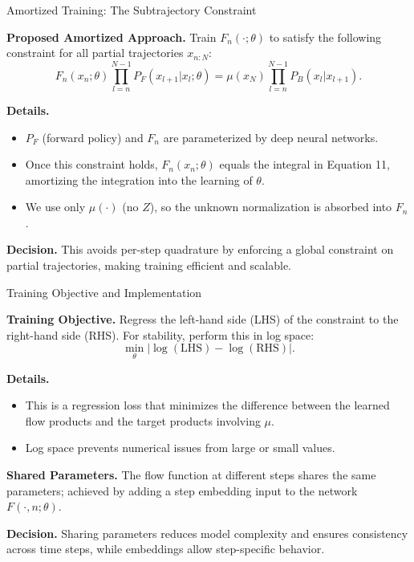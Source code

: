 \documentclass[aspectratio=169,xcolor=dvipsnames]{beamer}
\begin{document}
\begin{frame}[t]{Amortized Training: The Subtrajectory Constraint}
\footnotesize

\textbf{Proposed Amortized Approach.} Train $F_n(\cdot; \theta)$ to satisfy the following constraint for all partial trajectories $x_{n:N}$:
\[
F_n(x_n; \theta) \prod_{l=n}^{N-1} P_F(x_{l+1} | x_l; \theta) = \mu(x_N) \prod_{l=n}^{N-1} P_B(x_l | x_{l+1}).
\]

\textbf{Details.}
\begin{itemize}\itemsep2pt
  \item $P_F$ (forward policy) and $F_n$ are parameterized by deep neural networks.
  \item Once this constraint holds, $F_n(x_n; \theta)$ equals the integral in Equation 11, amortizing the integration into the learning of $\theta$.
  \item We use only $\mu(\cdot)$ (no $Z$), so the unknown normalization is absorbed into $F_n$.
\end{itemize}

\textbf{Decision.} This avoids per-step quadrature by enforcing a global constraint on partial trajectories, making training efficient and scalable.

\end{frame}

\begin{frame}[t]{Training Objective and Implementation}
\footnotesize

\textbf{Training Objective.} Regress the left-hand side (LHS) of the constraint to the right-hand side (RHS). For stability, perform this in log space:
\[
\min_\theta \left| \log(\text{LHS}) - \log(\text{RHS}) \right|.
\]

\textbf{Details.}
\begin{itemize}\itemsep2pt
  \item This is a regression loss that minimizes the difference between the learned flow products and the target products involving $\mu$.
  \item Log space prevents numerical issues from large or small values.
\end{itemize}

\textbf{Shared Parameters.} The flow function at different steps shares the same parameters; achieved by adding a step embedding input to the network $F(\cdot, n; \theta)$.

\textbf{Decision.} Sharing parameters reduces model complexity and ensures consistency across time steps, while embeddings allow step-specific behavior.

\end{frame}
\end{document}
